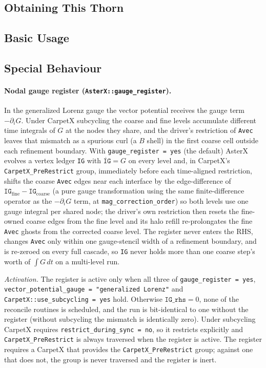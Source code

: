 \subsection{Obtaining This Thorn}

\subsection{Basic Usage}

\subsection{Special Behaviour}

\paragraph{Nodal gauge register (\texttt{AsterX::gauge\_register}).}
In the generalized Lorenz gauge the vector potential receives the gauge term
$-\partial_i G$. Under CarpetX subcycling the coarse and fine levels
accumulate different time integrals of $G$ at the nodes they share, and the
driver's restriction of \texttt{Avec} leaves that mismatch as a spurious curl
(a $B$ shell) in the first coarse cell outside each refinement boundary. With
\texttt{gauge\_register = yes} (the default) AsterX evolves a vertex ledger
\texttt{IG} with $\dot{\texttt{IG}} = G$ on every level and, in CarpetX's
\texttt{CarpetX\_PreRestrict} group, immediately before each time-aligned
restriction, shifts the coarse \texttt{Avec} edges near each interface by the
edge-difference of $\texttt{IG}_\mathrm{fine} - \texttt{IG}_\mathrm{coarse}$
(a pure gauge transformation using the same finite-difference operator as the
$-\partial_i G$ term, at \texttt{mag\_correction\_order}) so both levels use
one gauge integral per shared node; the driver's own restriction then resets
the fine-owned coarse edges from the fine level and its halo refill
re-prolongates the fine \texttt{Avec} ghosts from the corrected coarse level.
The register never enters the RHS,
changes \texttt{Avec} only within one gauge-stencil width of a refinement
boundary, and is re-zeroed on every full cascade, so \texttt{IG} never holds
more than one coarse step's worth of $\int G\,dt$ on a multi-level run.

\emph{Activation.} The register is active only when all three of
\texttt{gauge\_register = yes}, \texttt{vector\_potential\_gauge =
"generalized Lorenz"} and \texttt{CarpetX::use\_subcycling = yes} hold.
Otherwise $\texttt{IG\_rhs} = 0$, none of the reconcile routines is
scheduled, and the run is bit-identical to one without the register (without
subcycling the mismatch is identically zero). Under subcycling CarpetX
requires \texttt{restrict\_during\_sync = no}, so it restricts explicitly and
\texttt{CarpetX\_PreRestrict} is always traversed when the register is
active. The register requires a CarpetX that provides the
\texttt{CarpetX\_PreRestrict} group; against one that does not, the group is
never traversed and the register is inert.

